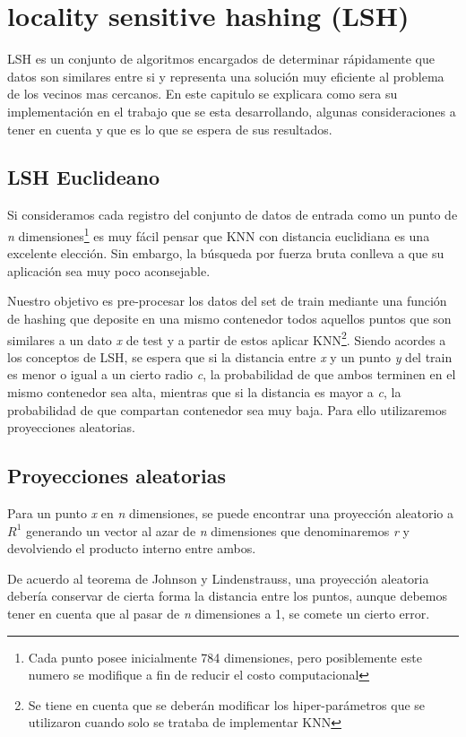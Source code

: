 \chapter{locality sensitive hashing (LSH)}
LSH es un conjunto de algoritmos encargados de determinar rápidamente que datos son similares entre si y representa una solución muy eficiente al problema de los vecinos mas cercanos. En este capitulo se explicara como sera su implementación en el trabajo que se esta desarrollando, algunas consideraciones a tener en cuenta y que es lo que se espera de sus resultados.

\section{LSH Euclideano}
Si consideramos cada registro del conjunto de datos de entrada como un punto de \textit{n} dimensiones\footnote{Cada punto posee inicialmente 784 dimensiones, pero posiblemente este numero se modifique a fin de reducir el costo computacional} es muy fácil pensar que KNN con distancia euclidiana es una excelente elección. Sin embargo, la búsqueda por fuerza bruta conlleva a que su aplicación sea muy poco aconsejable. 

Nuestro objetivo es pre-procesar los datos del set de train mediante una función de hashing que deposite en una mismo contenedor todos aquellos puntos que son similares a un dato \textit{x} de test y a partir de estos aplicar KNN\footnote{Se tiene en cuenta que se deberán modificar los hiper-parámetros que se utilizaron cuando solo se trataba de implementar KNN}. Siendo acordes a los conceptos de LSH, se espera que si la distancia entre \textit{x} y un punto \textit{y} del train es menor o igual a un cierto radio \textit{c}, la probabilidad de que ambos terminen en el mismo contenedor sea alta, mientras que si la distancia es mayor a \textit{c}, la probabilidad de que compartan contenedor sea muy baja. Para ello utilizaremos proyecciones aleatorias.

\section{Proyecciones aleatorias}
Para un punto \textit{x} en \textit{n} dimensiones, se puede encontrar una proyección aleatorio a $ R^{1} $ generando un vector al azar de \textit{n} dimensiones que denominaremos \textit{r} y devolviendo el producto interno entre ambos.

De acuerdo al teorema de Johnson y Lindenstrauss, una proyección aleatoria debería conservar de cierta forma la distancia entre los puntos, aunque debemos tener en cuenta que al pasar de \textit{n} dimensiones a 1, se comete un cierto error.

